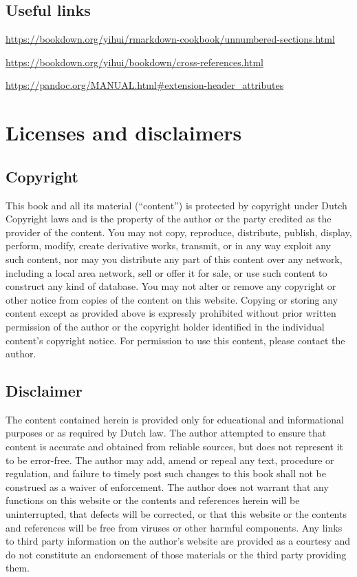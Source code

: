 \documentclass[
]{book}
\begin{document}
\hypertarget{useful-links}{%
\section{Useful links}\label{useful-links}}

\url{https://bookdown.org/yihui/rmarkdown-cookbook/unnumbered-sections.html}

\url{https://bookdown.org/yihui/bookdown/cross-references.html}

\url{https://pandoc.org/MANUAL.html\#extension-header_attributes}

\hypertarget{license}{%
\chapter{Licenses and disclaimers}\label{license}}

\hypertarget{copyright}{%
\section{Copyright}\label{copyright}}

This book and all its material (``content'') is protected by copyright under Dutch Copyright laws and is the property of the author or the party credited as the provider of the content. You may not copy, reproduce, distribute, publish, display, perform, modify, create derivative works, transmit, or in any way exploit any such content, nor may you distribute any part of this content over any network, including a local area network, sell or offer it for sale, or use such content to construct any kind of database. You may not alter or remove any copyright or other notice from copies of the content on this website. Copying or storing any content except as provided above is expressly prohibited without prior written permission of the author or the copyright holder identified in the individual content's copyright notice. For permission to use this content, please contact the author.

\hypertarget{disclaimer}{%
\section{Disclaimer}\label{disclaimer}}

The content contained herein is provided only for educational and informational purposes or as required by Dutch law. The author attempted to ensure that content is accurate and obtained from reliable sources, but does not represent it to be error-free. The author may add, amend or repeal any text, procedure or regulation, and failure to timely post such changes to this book shall not be construed as a waiver of enforcement. The author does not warrant that any functions on this website or the contents and references herein will be uninterrupted, that defects will be corrected, or that this website or the contents and references will be free from viruses or other harmful components. Any links to third party information on the author's website are provided as a courtesy and do not constitute an endorsement of those materials or the third party providing them.

  
\end{document}
